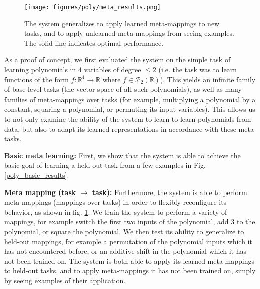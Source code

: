 \documentclass{article}
\begin{document}
\begin{figure}
\centering
\texttt{[image: figures/poly/meta\_results.png]}
\caption{The system generalizes to apply learned meta-mappings to new tasks, and to apply unlearned meta-mappings from seeing examples. The solid line indicates optimal performance.} 
\label{poly_meta_map_results}
\end{figure}
As a proof of concept, we first evaluated the system on the simple task of learning polynomials in 4 variables of degree $\leq 2$ (i.e. the task was to learn functions of the form $f: \mathbb{R}^4 \rightarrow \mathbb{R}$ where $f \in \mathcal{P}_2 \left(\mathbb{R}\right)$). This yields an infinite family of base-level tasks (the vector space of all such polynomials), as well as many families of meta-mappings over tasks (for example, multiplying a polynomial by a constant, squaring a polynomial, or permuting its input variables). This allows us to not only examine the ability of the system to learn to learn polynomials from data, but also to adapt its learned representations in accordance with these meta-tasks. \par

\textbf{Basic meta learning:} First, we show that the system is able to achieve the basic goal of learning a held-out task from a few examples in Fig. \ref{poly_basic_results}. \par 

\textbf{Meta mapping (task $\rightarrow$ task):} Furthermore, the system is able to perform meta-mappings (mappings over tasks) in order to flexibly reconfigure its behavior, as shown in fig. \ref{poly_meta_map_results}. We train the system to perform a variety of mappings, for example switch the first two inputs of the polynomial, add 3 to the polynomial, or square the polynomial. We then test its ability to generalize to held-out mappings, for example a permutation of the polynomial inputs which it has not encountered before, or an additive shift in the polynomial which it has not been trained on. The system is both able to apply its learned meta-mappings to held-out tasks, and to apply meta-mappings it has not been trained on, simply by seeing examples of their application. \par 
\end{document}
